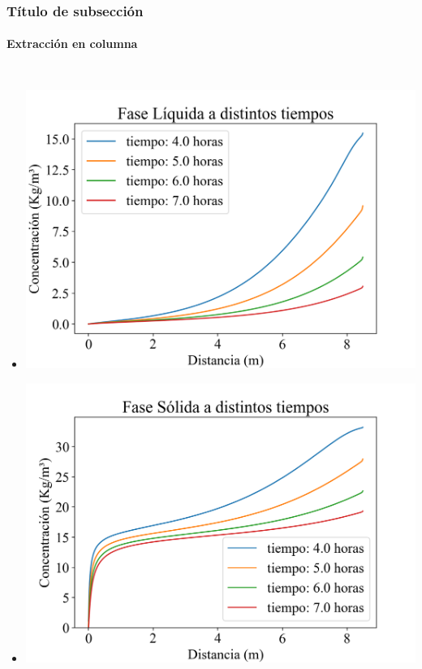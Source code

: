 \documentclass[aspectratio=1610]{beamer}
\newcommand{\ssec}{Título de subsección}
\begin{document}
\begin{frame}
	\frametitle{\ssec}
	\framesubtitle{Extracción en columna}
	\begin{columns}
		\begin{itemize}
		\setlength\itemsep{-0.5em}
		\item[] \includegraphics[height=0.35\textheight]{figs/model-columna-simple-concentraciones-liquido.png}
		\item[] \includegraphics[height=0.35\textheight]{figs/model-columna-simple-concentraciones-solido.png}
		\end{itemize}

\end{columns}
\end{frame}
\end{document}
